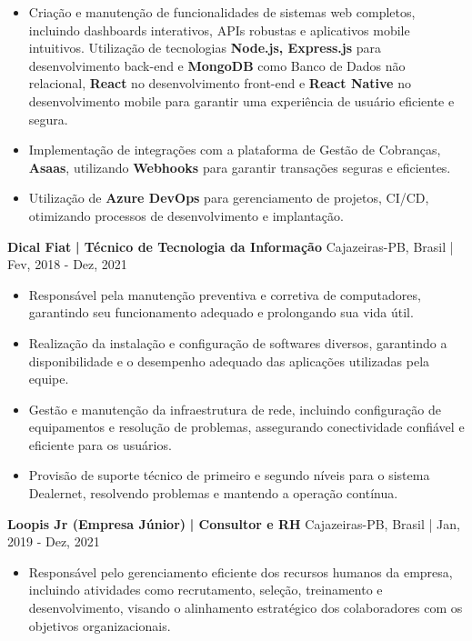 \documentclass[a4paper]{article}
\begin{document}
\begin{itemize} \itemsep -3pt
    \item Criação e manutenção de funcionalidades de sistemas web completos, incluindo dashboards interativos, APIs robustas e aplicativos mobile intuitivos.
          Utilização de tecnologias \textbf{Node.js, Express.js} para desenvolvimento back-end e \textbf{MongoDB} como Banco de Dados não relacional, \textbf{React} no desenvolvimento front-end e \textbf{React Native} no desenvolvimento mobile
          para garantir uma experiência de usuário eficiente e segura.
    \item  Implementação de integrações com a plataforma de Gestão de Cobranças, \textbf{Asaas}, utilizando \textbf{Webhooks} para garantir transações seguras e eficientes.
    \item Utilização de \textbf{Azure DevOps} para gerenciamento de projetos, CI/CD, otimizando processos de desenvolvimento e implantação.


\end{itemize}
\textbf{Dical Fiat}\textbf{ | Técnico de Tecnologia da Informação} \hfill Cajazeiras-PB, Brasil | Fev, 2018 - Dez, 2021\\
\vspace{-3mm}
\begin{itemize} \itemsep -3pt
    \item  Responsável pela manutenção preventiva e corretiva de computadores, garantindo seu funcionamento adequado e prolongando sua vida útil.
    \item  Realização da instalação e configuração de softwares diversos, garantindo a disponibilidade e o desempenho adequado das aplicações utilizadas pela equipe.
    \item  Gestão e manutenção da infraestrutura de rede, incluindo configuração de equipamentos e resolução de problemas, assegurando conectividade confiável e eficiente para os usuários.
    \item  Provisão de suporte técnico de primeiro e segundo níveis para o sistema Dealernet, resolvendo problemas e mantendo a operação contínua.
\end{itemize}
\textbf{Loopis Jr (Empresa Júnior)}\textbf{ | Consultor e RH} \hfill Cajazeiras-PB, Brasil | Jan, 2019 - Dez, 2021\\
\vspace{-3mm}
\begin{itemize} \itemsep -3pt
    \item  Responsável pelo gerenciamento eficiente dos recursos humanos da empresa, incluindo atividades como recrutamento, seleção, treinamento e desenvolvimento, visando o alinhamento estratégico dos colaboradores com os objetivos organizacionais.

\end{itemize}
\end{document}
